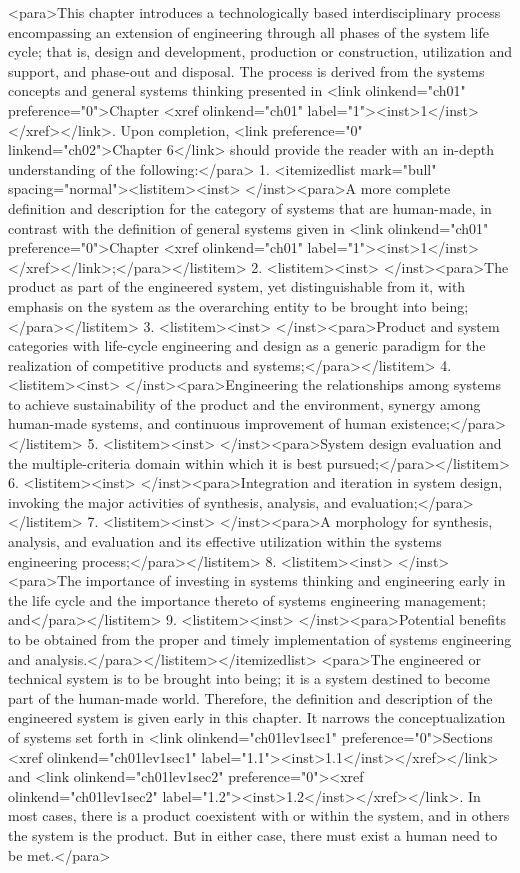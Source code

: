 <para>This chapter introduces a technologically based interdisciplinary process encompassing an extension of engineering through all phases of the system life cycle; that is, design and development, production or construction, utilization and support, and phase-out and disposal. The process is derived from the systems concepts and general systems thinking presented in <link olinkend="ch01" preference="0">Chapter <xref olinkend="ch01" label="1"><inst>1</inst></xref></link>. Upon completion, <link preference="0" linkend="ch02">Chapter 6</link> should provide the reader with an in-depth understanding of the following:</para>
    1. <itemizedlist mark="bull" spacing="normal"><listitem><inst>	</inst><para>A more complete definition and description for the category of systems that are human-made, in contrast with the definition of general systems given in <link olinkend="ch01" preference="0">Chapter <xref olinkend="ch01" label="1"><inst>1</inst></xref></link>;</para></listitem>
    2. <listitem><inst>	</inst><para>The product as part of the engineered system, yet distinguishable from it, with emphasis on the system as the overarching entity to be brought into being;</para></listitem>
    3. <listitem><inst>	</inst><para>Product and system categories with life-cycle engineering and design as a generic paradigm for the realization of competitive products and systems;</para></listitem>
    4. <listitem><inst>	</inst><para>Engineering the relationships among systems to achieve sustainability of the product and the environment, synergy among human-made systems, and continuous improvement of human existence;</para></listitem>
    5. <listitem><inst>	</inst><para>System design evaluation and the multiple-criteria domain within which it is best pursued;</para></listitem>
    6. <listitem><inst>	</inst><para>Integration and iteration in system design, invoking the major activities of synthesis, analysis, and evaluation;</para></listitem>
    7. <listitem><inst>	</inst><para>A morphology for synthesis, analysis, and evaluation and its effective utilization within the systems engineering process;</para></listitem>
    8. <listitem><inst>	</inst><para>The importance of investing in systems thinking and engineering early in the life cycle and the importance thereto of systems engineering management; and</para></listitem>
    9. <listitem><inst>	</inst><para>Potential benefits to be obtained from the proper and timely implementation of systems engineering and analysis.</para></listitem></itemizedlist>
<para>The engineered or technical system is to be brought into being; it is a system destined to become part of the human-made world. Therefore, the definition and description of the engineered system is given early in this chapter. It narrows the conceptualization of systems set forth in <link olinkend="ch01lev1sec1" preference="0">Sections <xref olinkend="ch01lev1sec1" label="1.1"><inst>1.1</inst></xref></link> and <link olinkend="ch01lev1sec2" preference="0"><xref olinkend="ch01lev1sec2" label="1.2"><inst>1.2</inst></xref></link>. In most cases, there is a product coexistent with or within the system, and in others the system is the product. But in either case, there must exist a human need to be met.</para>
